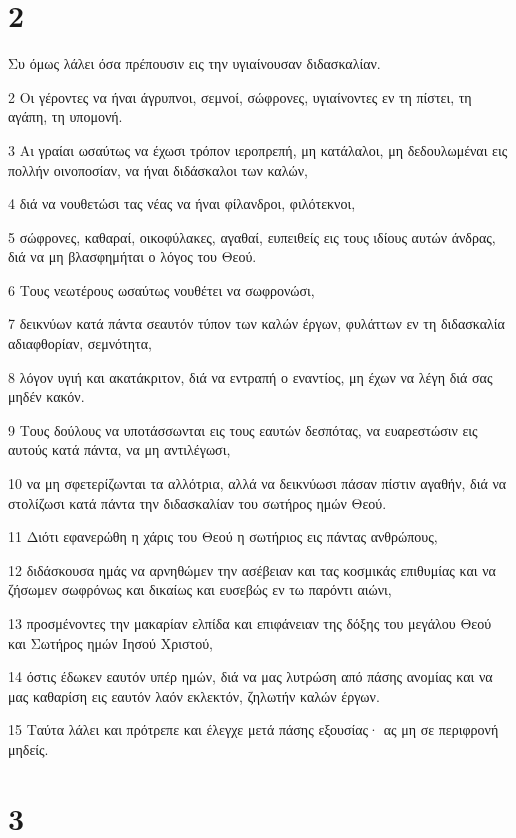 \chapter{2}

\par Συ όμως λάλει όσα πρέπουσιν εις την υγιαίνουσαν διδασκαλίαν.
\par 2 Οι γέροντες να ήναι άγρυπνοι, σεμνοί, σώφρονες, υγιαίνοντες εν τη πίστει, τη αγάπη, τη υπομονή.
\par 3 Αι γραίαι ωσαύτως να έχωσι τρόπον ιεροπρεπή, μη κατάλαλοι, μη δεδουλωμέναι εις πολλήν οινοποσίαν, να ήναι διδάσκαλοι των καλών,
\par 4 διά να νουθετώσι τας νέας να ήναι φίλανδροι, φιλότεκνοι,
\par 5 σώφρονες, καθαραί, οικοφύλακες, αγαθαί, ευπειθείς εις τους ιδίους αυτών άνδρας, διά να μη βλασφημήται ο λόγος του Θεού.
\par 6 Τους νεωτέρους ωσαύτως νουθέτει να σωφρονώσι,
\par 7 δεικνύων κατά πάντα σεαυτόν τύπον των καλών έργων, φυλάττων εν τη διδασκαλία αδιαφθορίαν, σεμνότητα,
\par 8 λόγον υγιή και ακατάκριτον, διά να εντραπή ο εναντίος, μη έχων να λέγη διά σας μηδέν κακόν.
\par 9 Τους δούλους να υποτάσσωνται εις τους εαυτών δεσπότας, να ευαρεστώσιν εις αυτούς κατά πάντα, να μη αντιλέγωσι,
\par 10 να μη σφετερίζωνται τα αλλότρια, αλλά να δεικνύωσι πάσαν πίστιν αγαθήν, διά να στολίζωσι κατά πάντα την διδασκαλίαν του σωτήρος ημών Θεού.
\par 11 Διότι εφανερώθη η χάρις του Θεού η σωτήριος εις πάντας ανθρώπους,
\par 12 διδάσκουσα ημάς να αρνηθώμεν την ασέβειαν και τας κοσμικάς επιθυμίας και να ζήσωμεν σωφρόνως και δικαίως και ευσεβώς εν τω παρόντι αιώνι,
\par 13 προσμένοντες την μακαρίαν ελπίδα και επιφάνειαν της δόξης του μεγάλου Θεού και Σωτήρος ημών Ιησού Χριστού,
\par 14 όστις έδωκεν εαυτόν υπέρ ημών, διά να μας λυτρώση από πάσης ανομίας και να μας καθαρίση εις εαυτόν λαόν εκλεκτόν, ζηλωτήν καλών έργων.
\par 15 Ταύτα λάλει και πρότρεπε και έλεγχε μετά πάσης εξουσίας· ας μη σε περιφρονή μηδείς.

\chapter{3}

